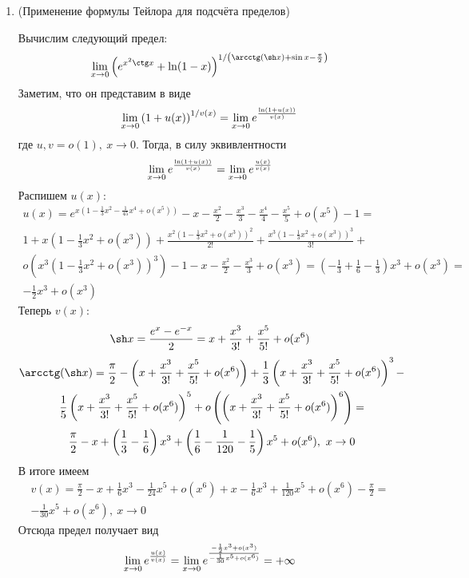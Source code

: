 \begin{enumerate}
	\item (Применение формулы Тейлора для подсчёта пределов)
	\begin{example}
		Вычислим следующий предел:
		\[
			\liml_{x \to 0} \left(e^{x^2 \ctg x} + \ln(1 - x)\right)^{1 / \left(\arcctg (\sh x) + \sin x - \frac{\pi}{2}\right)}
		\]
		Заметим, что он представим в виде
		\[
			\lim\limits_{x \to 0} \left(1 + u(x)\right)^{1 / v(x)} = \lim\limits_{x \to 0} e^{ \frac{\ln (1 + u(x))}{v(x)}}
		\]
		где $u, v = o(1),\ x \to 0$. Тогда, в силу эквивлентности
		\[
			\lim\limits_{x \to 0} e^{ \frac{\ln (1 + u(x))}{v(x)}} = \lim\limits_{x \to 0} e^{\frac{u(x)}{v(x)}}
		\]
		Распишем $u(x)$:
		\begin{multline*}
			u(x) = e^{x\left(1 - \frac{1}{3}x^2 - \frac{1}{45}x^4 + o(x^5)\right)} - x - \frac{x^2}{2} - \frac{x^3}{3} - \frac{x^4}{4} - \frac{x^5}{5} + o(x^5) - 1 =
			\\
			1 + x\left(1 - \frac{1}{3}x^2 + o(x^3)\right) + \frac{x^2\left(1 - \frac{1}{3}x^2 + o(x^3)\right)^2}{2!} + \frac{x^3\left(1 - \frac{1}{3}x^2 + o(x^3)\right)^3}{3!} + 
			\\
			o\left(x^3\left(1 - \frac{1}{3}x^2 + o(x^3)\right)^3\right) - 1 - x - \frac{x^2}{2} - \frac{x^3}{3} + o(x^3) = \left(-\frac{1}{3} + \frac{1}{6} - \frac{1}{3}\right)x^3 + o(x^3) = 
			\\
			-\frac{1}{2}x^3 + o(x^3)
		\end{multline*}
		Теперь $v(x)$:
		\[
			\sh x = \frac{e^x - e^{-x}}{2} = x + \frac{x^3}{3!} + \frac{x^5}{5!} + o(x^6)
		\]
		\begin{multline*}
			\arcctg(\sh x) = \frac{\pi}{2} - \left(x + \frac{x^3}{3!} + \frac{x^5}{5!} + o(x^6)\right) + \frac{1}{3}\left(x + \frac{x^3}{3!} + \frac{x^5}{5!} + o(x^6)\right)^3 -
			\\
			\frac{1}{5}\left(x + \frac{x^3}{3!} + \frac{x^5}{5!} + o(x^6)\right)^5 + o\left(\left(x + \frac{x^3}{3!} + \frac{x^5}{5!} + o(x^6)\right)^6\right) =
			\\
			\frac{\pi}{2} - x + \left(\frac{1}{3} - \frac{1}{6}\right)x^3 + \left(\frac{1}{6} - \frac{1}{120} - \frac{1}{5}\right)x^5 + o(x^6),\ x \to 0
		\end{multline*}
		В итоге имеем
		\begin{multline*}
			v(x) = \frac{\pi}{2} - x + \frac{1}{6}x^3 - \frac{1}{24}x^5 + o(x^6) + x - \frac{1}{6}x^3 + \frac{1}{120}x^5 + o(x^6) - \frac{\pi}{2} =
			\\
			-\frac{1}{30}x^5 + o(x^6),\ x \to 0
		\end{multline*}
		Отсюда предел получает вид
		\[
			\lim\limits_{x \to 0} e^{\frac{u(x)}{v(x)}} = \lim\limits_{x \to 0} e^{\frac{-\frac{1}{2}x^3 + o(x^3)}{-\frac{1}{30}x^5 + o(x^6)}} = +\infty
		\]
	\end{example}
\end{enumerate}

